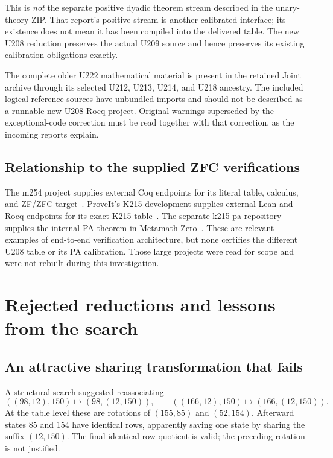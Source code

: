 \documentclass[11pt,letterpaper]{article}
\begin{document}
This is \emph{not} the separate positive dyadic theorem stream described in
the unary-theory ZIP. That report's positive stream is another calibrated
interface; its existence does not mean it has been compiled into the
delivered table. The new U208 reduction preserves the actual U209 source
and hence preserves its existing calibration obligations exactly.

The complete older U222 mathematical material is present in the retained
Joint archive through its selected U212, U213, U214, and U218 ancestry.
The included logical reference sources have unbundled imports and should
not be described as a runnable new U208 Rocq project. Original warnings
superseded by the exceptional-code correction must be read together with
that correction, as the incoming reports explain.

\subsection{Relationship to the supplied ZFC verifications}

The m254 project supplies external Coq endpoints for its literal table,
calculus, and ZF/ZFC target~\cite{m254}. ProveIt's K215 development supplies
external Lean and Rocq endpoints for its exact K215 table~\cite{k215}.
The separate k215-pa repository supplies the internal PA theorem in
Metamath Zero~\cite{k215pa}. These are relevant examples of end-to-end
verification architecture, but none certifies the different U208 table or
its PA calibration. Those large projects were read for scope and were not
rebuilt during this investigation.

\section{Rejected reductions and lessons from the search}
\subsection{An attractive sharing transformation that fails}

A structural search suggested reassociating
\[
 ((98,12),150)\longmapsto(98,(12,150)),\qquad
 ((166,12),150)\longmapsto(166,(12,150)).
\]
At the table level these are rotations of $(155,85)$ and $(52,154)$.
Afterward states 85 and 154 have identical rows, apparently saving one
state by sharing the suffix $(12,150)$. The final identical-row quotient is
valid; the preceding rotation is not justified.
\end{document}
